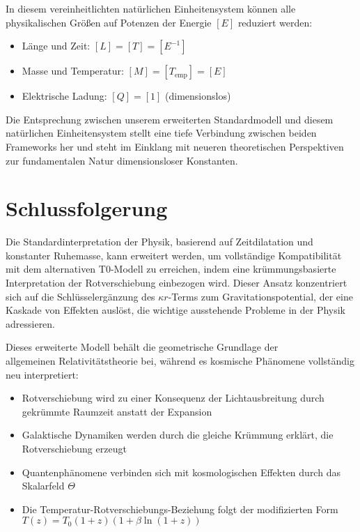 \documentclass[12pt,a4paper]{article}
\begin{document}
	In diesem vereinheitlichten natürlichen Einheitensystem können alle physikalischen Größen auf Potenzen der Energie $[E]$ reduziert werden\cite{pascher_alpha_2025}:
	\begin{itemize}
		\item Länge und Zeit: $[L] = [T] = [E^{-1}]$
		\item Masse und Temperatur: $[M] = [T_{\text{emp}}] = [E]$
		\item Elektrische Ladung: $[Q] = [1]$ (dimensionslos)
	\end{itemize}
	
	Die Entsprechung zwischen unserem erweiterten Standardmodell und diesem natürlichen Einheitensystem stellt eine tiefe Verbindung zwischen beiden Frameworks her und steht im Einklang mit neueren theoretischen Perspektiven zur fundamentalen Natur dimensionsloser Konstanten\cite{duff2002}.
	
	\section{Schlussfolgerung}
	\label{sec:conclusion}
	
	Die Standardinterpretation der Physik, basierend auf Zeitdilatation und konstanter Ruhemasse, kann erweitert werden, um vollständige Kompatibilität mit dem alternativen T0-Modell zu erreichen, indem eine krümmungsbasierte Interpretation der Rotverschiebung einbezogen wird. Dieser Ansatz konzentriert sich auf die Schlüsselergänzung des $\kappa r$-Terms zum Gravitationspotential, der eine Kaskade von Effekten auslöst, die wichtige ausstehende Probleme in der Physik adressieren.
	
	Dieses erweiterte Modell behält die geometrische Grundlage der \\allgemeinen Relativitätstheorie\cite{einstein1915} bei, während es kosmische Phänomene vollständig neu interpretiert:
	\begin{itemize}
		\item Rotverschiebung wird zu einer Konsequenz der Lichtausbreitung durch gekrümmte Raumzeit anstatt der Expansion\cite{pascher_messdifferenzen_2025}
		\item Galaktische Dynamiken werden durch die gleiche Krümmung erklärt, die Rotverschiebung erzeugt\cite{pascher_galaxies_2025}
		\item Quantenphänomene verbinden sich mit kosmologischen Effekten durch das Skalarfeld $\Theta$\cite{pascher_lagrange_2025}
		\item Die Temperatur-Rotverschiebungs-Beziehung folgt der modifizierten Form $T(z) = T_0 (1+z)(1+\beta \ln(1+z))$\cite{pascher_temp_2025}
	\end{itemize}
	
\end{document}
